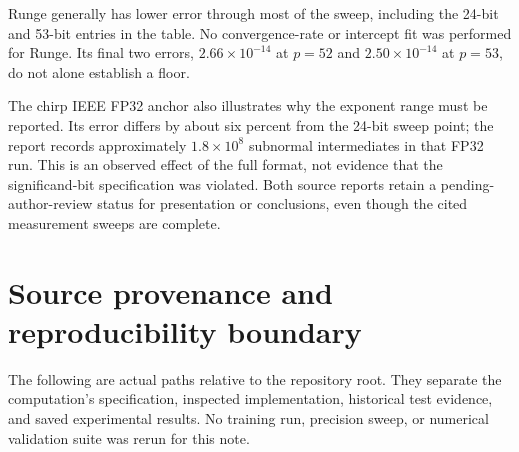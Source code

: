 \documentclass[11pt]{article}
\begin{document}
Runge generally has lower error through most of the sweep, including the
24-bit and 53-bit entries in the table. No convergence-rate or intercept fit
was performed for Runge. Its final two errors, $2.66\times10^{-14}$ at
$p=52$ and $2.50\times10^{-14}$ at $p=53$, do not alone establish a floor.

The chirp IEEE FP32 anchor also illustrates why the exponent range must be
reported. Its error differs by about six percent from the 24-bit sweep point;
the report records approximately $1.8\times10^8$ subnormal intermediates in
that FP32 run. This is an observed effect of the full format, not evidence
that the significand-bit specification was violated. Both source reports
retain a pending-author-review status for presentation or conclusions, even
though the cited measurement sweeps are complete.

\section{Source provenance and reproducibility boundary}

The following are actual paths relative to the repository root. They separate
the computation's specification, inspected implementation, historical test
evidence, and saved experimental results. No training run, precision sweep,
or numerical validation suite was rerun for this note.
\end{document}
